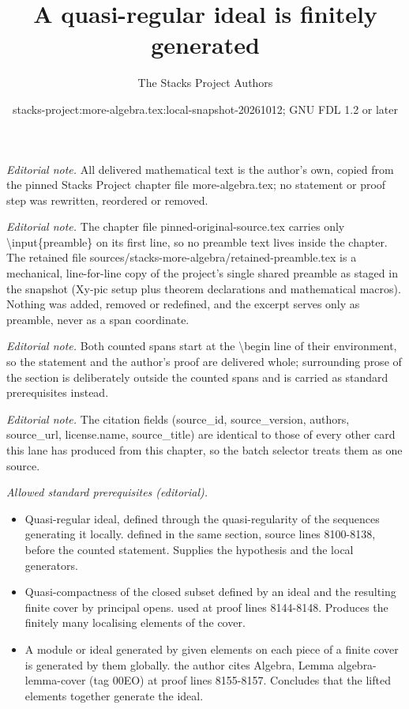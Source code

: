 \documentclass[10pt,a4paper]{amsart}
\title{A quasi-regular ideal is finitely generated}
\author{The Stacks Project Authors}
\date{stacks-project:more-algebra.tex:local-snapshot-20261012; GNU FDL 1.2 or later}
\theoremstyle{plain}
\theoremstyle{definition}
\theoremstyle{remark}
\numberwithin{equation}{subsection}
\begin{document}
\maketitle
\setcounter{subsection}{1}
\noindent\textit{Editorial note.} All delivered mathematical text is the author's own, copied from the pinned Stacks Project chapter file more-algebra.tex; no statement or proof step was rewritten, reordered or removed.\par\medskip
\noindent\textit{Editorial note.} The chapter file pinned-original-source.tex carries only \textbackslash{}input\{preamble\} on its first line, so no preamble text lives inside the chapter. The retained file sources/stacks-more-algebra/retained-preamble.tex is a mechanical, line-for-line copy of the project's single shared preamble as staged in the snapshot (Xy-pic setup plus theorem declarations and mathematical macros). Nothing was added, removed or redefined, and the excerpt serves only as preamble, never as a span coordinate.\par\medskip
\noindent\textit{Editorial note.} Both counted spans start at the \textbackslash{}begin line of their environment, so the statement and the author's proof are delivered whole; surrounding prose of the section is deliberately outside the counted spans and is carried as standard prerequisites instead.\par\medskip
\noindent\textit{Editorial note.} The citation fields (source\_id, source\_version, authors, source\_url, license.name, source\_title) are identical to those of every other card this lane has produced from this chapter, so the batch selector treats them as one source.\par\medskip
\noindent\textit{Allowed standard prerequisites (editorial).}\begin{itemize}
\item Quasi-regular ideal, defined through the quasi-regularity of the sequences generating it locally. defined in the same section, source lines 8100-8138, before the counted statement. Supplies the hypothesis and the local generators.
\item Quasi-compactness of the closed subset defined by an ideal and the resulting finite cover by principal opens. used at proof lines 8144-8148. Produces the finitely many localising elements of the cover.
\item A module or ideal generated by given elements on each piece of a finite cover is generated by them globally. the author cites Algebra, Lemma algebra-lemma-cover (tag 00EO) at proof lines 8155-8157. Concludes that the lifted elements together generate the ideal.
\end{itemize}\medskip
\end{document}
